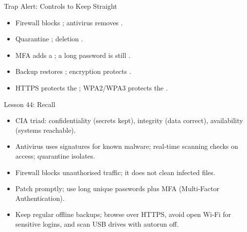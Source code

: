 \documentclass[aspectratio=169]{beamer}
\begin{document}
\begin{frame}{Trap Alert: Controls to Keep Straight}
  \begin{itemize}
    \item Firewall blocks ; antivirus removes .
    \item Quarantine ; deletion .
    \item MFA adds a ; a long password is still
      .
    \item Backup restores ; encryption protects
      .
    \item HTTPS protects the ; WPA2/WPA3 protects the
      .
  \end{itemize}
\end{frame}

\begin{frame}{Lesson 44: Recall}
  \begin{itemize}
    \item CIA triad: confidentiality (secrets kept), integrity (data
      correct), availability (systems reachable).
    \item Antivirus uses signatures for known malware; real-time scanning
      checks on access; quarantine isolates.
    \item Firewall blocks unauthorised traffic; it does not clean infected
      files.
    \item Patch promptly; use long unique passwords plus MFA (Multi-Factor
      Authentication).
    \item Keep regular offline backups; browse over HTTPS, avoid open Wi-Fi
      for sensitive logins, and scan USB drives with autorun off.
  \end{itemize}
\end{frame}
\end{document}
